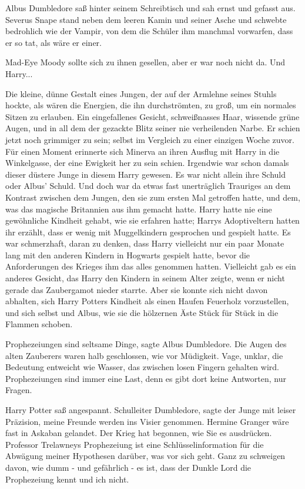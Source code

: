 Albus Dumbledore saß hinter seinem Schreibtisch und sah ernst und gefasst aus.
Severus Snape stand neben dem leeren Kamin und seiner Asche und schwebte
bedrohlich wie der Vampir, von dem die Schüler ihm manchmal vorwarfen, dass er
so tat, als wäre er einer.

Mad-Eye Moody sollte sich zu ihnen gesellen, aber er war noch nicht da. Und
Harry...

Die kleine, dünne Gestalt eines Jungen, der auf der Armlehne seines Stuhls
hockte, als wären die Energien, die ihn durchströmten, zu groß, um ein normales
Sitzen zu erlauben. Ein eingefallenes Gesicht, schweißnasses Haar, wissende
grüne Augen, und in all dem der gezackte Blitz seiner nie verheilenden Narbe. Er
schien jetzt noch grimmiger zu sein; selbst im Vergleich zu einer einzigen Woche
zuvor. Für einen Moment erinnerte sich Minerva an ihren Ausflug mit Harry in die
Winkelgasse, der eine Ewigkeit her zu sein schien. Irgendwie war schon damals
dieser düstere Junge in diesem Harry gewesen. Es war nicht allein ihre Schuld
oder Albus' Schuld. Und doch war da etwas fast unerträglich Trauriges an dem
Kontrast zwischen dem Jungen, den sie zum ersten Mal getroffen hatte, und dem,
was das magische Britannien aus ihm gemacht hatte. Harry hatte nie eine
gewöhnliche Kindheit gehabt, wie sie erfahren hatte; Harrys Adoptiveltern hatten
ihr erzählt, dass er wenig mit Muggelkindern gesprochen und gespielt hatte. Es
war schmerzhaft, daran zu denken, dass Harry vielleicht nur ein paar Monate lang
mit den anderen Kindern in Hogwarts gespielt hatte, bevor die Anforderungen des
Krieges ihm das alles genommen hatten. Vielleicht gab es ein anderes Gesicht,
das Harry den Kindern in seinem Alter zeigte, wenn er nicht gerade das
Zaubergamot nieder starrte. Aber sie konnte sich nicht davon abhalten, sich
Harry Potters Kindheit als einen Haufen Feuerholz vorzustellen, und sich selbst
und Albus, wie sie die hölzernen Äste Stück für Stück in die Flammen schoben.

\glqq Prophezeiungen sind seltsame Dinge\grqq{}, sagte Albus Dumbledore. Die
Augen des alten Zauberers waren halb geschlossen, wie vor Müdigkeit. \glqq Vage,
unklar, die Bedeutung entweicht wie Wasser, das zwischen losen Fingern gehalten
wird. Prophezeiungen sind immer eine Last, denn es gibt dort keine Antworten,
nur Fragen.\grqq{}

Harry Potter saß angespannt. \glqq Schulleiter Dumbledore\grqq{}, sagte der
Junge mit leiser Präzision, \glqq meine Freunde werden ins Visier genommen.
Hermine Granger wäre fast in Askaban gelandet. Der Krieg hat begonnen, wie Sie
es ausdrücken. Professor Trelawneys Prophezeiung ist eine Schlüsselinformation
für die Abwägung meiner Hypothesen darüber, was vor sich geht. Ganz zu schweigen
davon, wie dumm - und gefährlich - es ist, dass der Dunkle Lord die Prophezeiung
kennt und ich nicht.\grqq{}

